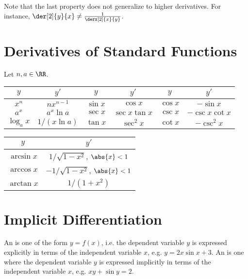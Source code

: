 Note that the last property does not generalize to higher derivatives. For instance, $\der[2]{y}{x} \neq \frac1{\derx[2]{x}{y}}$.

\section{Derivatives of Standard Functions}

Let $n, a \in \RR$.

\begin{table}[H]
    \centering
    \begin{tabular}{|c|c|c|c|c|c|}
    \hline
    $y$ & $y'$ & $y$ & $y'$ & $y$ & $y'$ \\ \hline\hline
    $x^n$ & $n x^{n-1}$ & $\sin x$ & $\cos x$ & $\cos x$ & $-\sin x$\\ \hline
    $a^x$ & $a^x \ln a$ & $\sec x$ & $\sec x \tan x$ & $\csc x$ & $-\csc x \cot x$\\ \hline
    $\log_a x$ & $1/(x\ln a)$ & $\tan x$ & $\sec^2 x$ & $\cot x$ & $-\csc^2 x$\\ \hline
    \end{tabular}
\end{table}

\begin{table}[H]
    \centering
    \begin{tabular}{|c|c|}
    \hline
    $y$ & $y'$ \\ \hline\hline
    $\arcsin x$ & $1/\sqrt{1 - x^2}$, $\abs{x} < 1$ \\ \hline
    $\arccos x$ & $-1/\sqrt{1 - x^2}$, $\abs{x} < 1$ \\ \hline
    $\arctan x$ & $1/(1 + x^2)$ \\ \hline
    \end{tabular}
\end{table}

\section{Implicit Differentiation}

\begin{definition}
    An  is one of the form $y = f(x)$, i.e. the dependent variable $y$ is expressed explicitly in terms of the independent variable $x$, e.g. $y = 2x \sin x + 3$. An  is one where the dependent variable $y$ is expressed implicitly in terms of the independent variable $x$, e.g. $xy + \sin y = 2$.
\end{definition}

